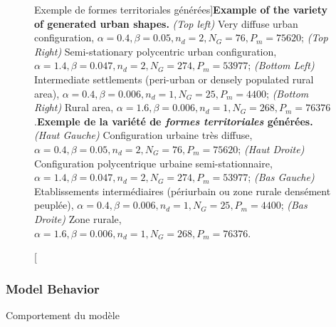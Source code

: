 \begin{figure}
\caption[Example of the variety of generated urban shapes][Exemple de formes territoriales générées]{\textbf{Example of the variety of generated urban shapes.} \textit{(Top left)} Very diffuse urban configuration, $\alpha = 0.4,\beta = 0.05, n_d = 2, N_G = 76, P_m = 75620$; \textit{(Top Right)} Semi-stationary polycentric urban configuration, $\alpha = 1.4,\beta = 0.047, n_d = 2, N_G = 274, P_m = 53977$; \textit{(Bottom Left)} Intermediate settlements (peri-urban or densely populated rural area), $\alpha = 0.4,\beta = 0.006, n_d = 1, N_G = 25, P_m = 4400$; \textit{(Bottom Right)} Rural area, $\alpha = 1.6,\beta = 0.006, n_d = 1, N_G = 268, P_m = 76376$.\label{fig:density:fig2}}{\textbf{Exemple de la variété de \emph{formes territoriales} générées.} \textit{(Haut Gauche)} Configuration urbaine très diffuse, $\alpha = 0.4,\beta = 0.05, n_d = 2, N_G = 76, P_m = 75620$; \textit{(Haut Droite)} Configuration polycentrique urbaine semi-stationnaire, $\alpha = 1.4,\beta = 0.047, n_d = 2, N_G = 274, P_m = 53977$; \textit{(Bas Gauche)} Etablissements intermédiaires (périurbain ou zone rurale densément peuplée), $\alpha = 0.4,\beta = 0.006, n_d = 1, N_G = 25, P_m = 4400$; \textit{(Bas Droite)} Zone rurale, $\alpha = 1.6,\beta = 0.006, n_d = 1, N_G = 268, P_m = 76376$.\label{fig:density:fig2}}
\end{figure}




\subsubsection{Model Behavior}{Comportement du modèle}



